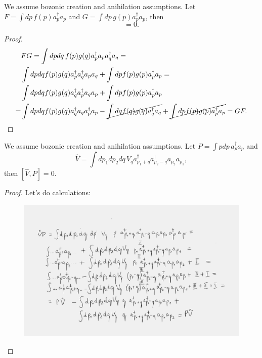 \documentclass[main.tex]{subfiles}
\begin{document}
\begin{proposition} We assume bozonic creation and anihilation assumptions.
Let $F = \int dp\, f(p)a^\dagger_p a_p$ and $G = \int dp\, g(p)a^\dagger_p a_p$, then
\begin{equation}
[F, G] = 0.
\end{equation} 
\end{proposition}
\begin{proof}
\begin{align*}
&FG = \int dp dq \,f(p)g(q) a^\dagger_p a_p a^\dagger_q a_q = \\
& \int dp dq f(p)g(q) a^\dagger_p  a^\dagger_q a_p a_q + \int dp f(p)g(p) a^\dagger_p a_p =  \\
& \int dp dq f(p)g(q) a^\dagger_q a^\dagger_p  a_q  a_p  + \int dp f(p)g(p) a^\dagger_p a_p \\ =
& \int dp dq f(p)g(q) a^\dagger_q a_q a^\dagger_p   a_p - \cancel{\int dq f(q)g(q) a^\dagger_q    a_q}  + \cancel{\int dp f(p)g(p) a^\dagger_p a_p} 
= GF. \\ 
\end{align*}
\end{proof}

\begin{proposition}
We assume bozonic creation and anihilation assumptions. Let $P = \int pdp\, a^\dagger_p a_p$ and
\begin{equation}
\hat{V} = \int dp_1 dp_2 dq\, V_q a^\dagger_{p_1 + q} a^\dagger_{p_2 - q} a_{p_2}a_{p_1}, 
\end{equation}
then $[\hat{V}, P] = 0.$
\end{proposition}
\begin{proof}
Let's do calculations:
\begin{figure}[H]
\includegraphics[width=\textwidth]{figs/two_body_potential}
\end{figure}

\end{proof}
\end{document}
